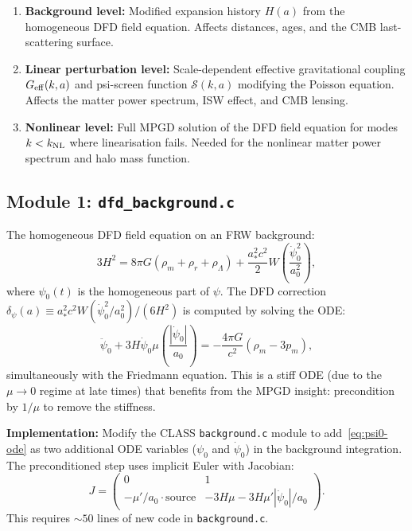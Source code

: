 \documentclass[11pt]{article}
\theoremstyle{definition}
\theoremstyle{remark}
\begin{document}
\begin{enumerate}
\item \textbf{Background level:} Modified expansion history $H(a)$ from
  the homogeneous DFD field equation. Affects distances, ages, and the
  CMB last-scattering surface.
\item \textbf{Linear perturbation level:} Scale-dependent effective
  gravitational coupling $G_{\rm eff}(k,a)$ and psi-screen function
  $\mathcal{S}(k,a)$ modifying the Poisson equation. Affects the matter
  power spectrum, ISW effect, and CMB lensing.
\item \textbf{Nonlinear level:} Full MPGD solution of the DFD field
  equation for modes $k < k_{\rm NL}$ where linearisation fails.
  Needed for the nonlinear matter power spectrum and halo mass function.
\end{enumerate}

\subsection{Module 1: \texttt{dfd\_background.c}}
\label{sec:dfd-background}

The homogeneous DFD field equation on an FRW background:
\begin{equation}
  3H^2 = 8\pi G(\rho_m + \rho_r + \rho_\Lambda)
  + \frac{a_*^2 c^2}{2} W\!\left(\frac{\dot\psi_0^2}{a_0^2}\right),
  \label{eq:dfd-friedmann}
\end{equation}
where $\psi_0(t)$ is the homogeneous part of $\psi$. The DFD correction
$\delta_\psi(a) \equiv a_*^2 c^2 W(\dot\psi_0^2/a_0^2) / (6H^2)$
is computed by solving the ODE:
\begin{equation}
  \ddot\psi_0 + 3H\dot\psi_0 \mu\!\left(\frac{|\dot\psi_0|}{a_0}\right)
  = -\frac{4\pi G}{c^2}(\rho_m - 3p_m),
  \label{eq:psi0-ode}
\end{equation}
simultaneously with the Friedmann equation. This is a stiff ODE (due to the
$\mu \to 0$ regime at late times) that benefits from the MPGD insight:
precondition by $1/\mu$ to remove the stiffness.

\textbf{Implementation:} Modify the CLASS \texttt{background.c} module
to add~\eqref{eq:psi0-ode} as two additional ODE variables ($\psi_0$
and $\dot\psi_0$) in the background integration. The preconditioned
step uses implicit Euler with Jacobian:
\begin{equation}
  J = \begin{pmatrix} 0 & 1 \\ -\mu'/a_0 \cdot \text{source} & -3H\mu - 3H\mu'|\dot\psi_0|/a_0 \end{pmatrix}.
  \label{eq:background-jacobian}
\end{equation}
This requires $\sim 50$ lines of new code in \texttt{background.c}.
\end{document}
